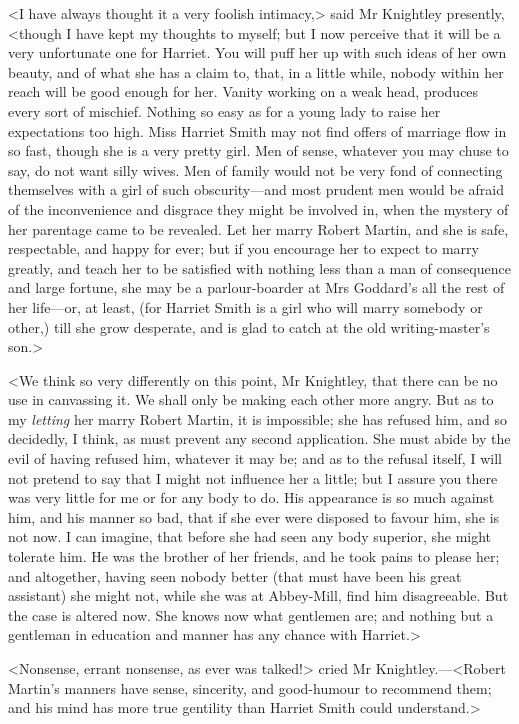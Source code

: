 <I have always thought it a very foolish intimacy,> said Mr Knightley presently, <though I have kept my thoughts to myself; but I now perceive that it will be a very unfortunate one for Harriet. You will puff her up with such ideas of her own beauty, and of what she has a claim to, that, in a little while, nobody within her reach will be good enough for her. Vanity working on a weak head, produces every sort of mischief. Nothing so easy as for a young lady to raise her expectations too high. Miss Harriet Smith may not find offers of marriage flow in so fast, though she is a very pretty girl. Men of sense, whatever you may chuse to say, do not want silly wives. Men of family would not be very fond of connecting themselves with a girl of such obscurity—and most prudent men would be afraid of the inconvenience and disgrace they might be involved in, when the mystery of her parentage came to be revealed. Let her marry Robert Martin, and she is safe, respectable, and happy for ever; but if you encourage her to expect to marry greatly, and teach her to be satisfied with nothing less than a man of consequence and large fortune, she may be a parlour-boarder at Mrs Goddard's all the rest of her life—or, at least, (for Harriet Smith is a girl who will marry somebody or other,) till she grow desperate, and is glad to catch at the old writing-master's son.>

<We think so very differently on this point, Mr Knightley, that there can be no use in canvassing it. We shall only be making each other more angry. But as to my \textit{letting} her marry Robert Martin, it is impossible; she has refused him, and so decidedly, I think, as must prevent any second application. She must abide by the evil of having refused him, whatever it may be; and as to the refusal itself, I will not pretend to say that I might not influence her a little; but I assure you there was very little for me or for any body to do. His appearance is so much against him, and his manner so bad, that if she ever were disposed to favour him, she is not now. I can imagine, that before she had seen any body superior, she might tolerate him. He was the brother of her friends, and he took pains to please her; and altogether, having seen nobody better (that must have been his great assistant) she might not, while she was at Abbey-Mill, find him disagreeable. But the case is altered now. She knows now what gentlemen are; and nothing but a gentleman in education and manner has any chance with Harriet.>

<Nonsense, errant nonsense, as ever was talked!> cried Mr Knightley.—<Robert Martin's manners have sense, sincerity, and good-humour to recommend them; and his mind has more true gentility than Harriet Smith could understand.>

